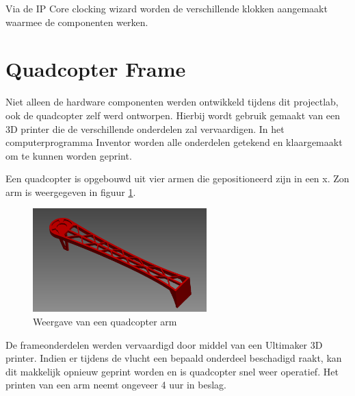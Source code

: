		\par Via de IP Core clocking wizard worden de verschillende klokken aangemaakt waarmee de componenten werken. 

	\section{Quadcopter Frame}

		\par Niet alleen de hardware componenten werden ontwikkeld tijdens dit projectlab, ook de quadcopter zelf werd ontworpen. Hierbij wordt gebruik gemaakt van een 3D printer die de verschillende onderdelen zal vervaardigen. In het computerprogramma Inventor worden alle onderdelen getekend en klaargemaakt om te kunnen worden geprint.

		\par Een quadcopter is opgebouwd uit vier armen die gepositioneerd zijn in een \textquotesingle x\textquotesingle. Zo\textquotesingle n arm is weergegeven in figuur \ref{quad_frame_pict}. 

			\begin{figure}[H]					  
				  \centering
				  \includegraphics[width=0.6\textwidth]{Implementatie/frame.png}
				  \caption{Weergave van een quadcopter arm}
				  \label{quad_frame_pict}
			\end{figure}

		\par De frameonderdelen werden vervaardigd door middel van een Ultimaker 3D printer. Indien er tijdens de vlucht een bepaald onderdeel beschadigd raakt, kan dit makkelijk opnieuw geprint worden en is quadcopter snel weer operatief. Het printen van een arm neemt ongeveer 4 uur in beslag.





